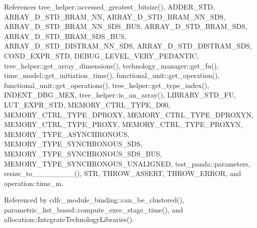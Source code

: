 References tree\+\_\+helper\+::accessed\+\_\+greatest\+\_\+bitsize(), A\+D\+D\+E\+R\+\_\+\+S\+TD, A\+R\+R\+A\+Y\+\_\+D\+\_\+\+S\+T\+D\+\_\+\+B\+R\+A\+M\+\_\+\+NN, A\+R\+R\+A\+Y\+\_\+D\+\_\+\+S\+T\+D\+\_\+\+B\+R\+A\+M\+\_\+\+N\+N\+\_\+\+S\+DS, A\+R\+R\+A\+Y\+\_\+D\+\_\+\+S\+T\+D\+\_\+\+B\+R\+A\+M\+\_\+\+N\+N\+\_\+\+S\+D\+S\+\_\+\+B\+US, A\+R\+R\+A\+Y\+\_\+D\+\_\+\+S\+T\+D\+\_\+\+B\+R\+A\+M\+\_\+\+S\+DS, A\+R\+R\+A\+Y\+\_\+D\+\_\+\+S\+T\+D\+\_\+\+B\+R\+A\+M\+\_\+\+S\+D\+S\+\_\+\+B\+US, A\+R\+R\+A\+Y\+\_\+D\+\_\+\+S\+T\+D\+\_\+\+D\+I\+S\+T\+R\+A\+M\+\_\+\+N\+N\+\_\+\+S\+DS, A\+R\+R\+A\+Y\+\_\+D\+\_\+\+S\+T\+D\+\_\+\+D\+I\+S\+T\+R\+A\+M\+\_\+\+S\+DS, C\+O\+N\+D\+\_\+\+E\+X\+P\+R\+\_\+\+S\+TD, D\+E\+B\+U\+G\+\_\+\+L\+E\+V\+E\+L\+\_\+\+V\+E\+R\+Y\+\_\+\+P\+E\+D\+A\+N\+T\+IC, tree\+\_\+helper\+::get\+\_\+array\+\_\+dimensions(), technology\+\_\+manager\+::get\+\_\+fu(), time\+\_\+model\+::get\+\_\+initiation\+\_\+time(), functional\+\_\+unit\+::get\+\_\+operation(), functional\+\_\+unit\+::get\+\_\+operations(), tree\+\_\+helper\+::get\+\_\+type\+\_\+index(), I\+N\+D\+E\+N\+T\+\_\+\+D\+B\+G\+\_\+\+M\+EX, tree\+\_\+helper\+::is\+\_\+an\+\_\+array(), L\+I\+B\+R\+A\+R\+Y\+\_\+\+S\+T\+D\+\_\+\+FU, L\+U\+T\+\_\+\+E\+X\+P\+R\+\_\+\+S\+TD, M\+E\+M\+O\+R\+Y\+\_\+\+C\+T\+R\+L\+\_\+\+T\+Y\+P\+E\+\_\+\+D00, M\+E\+M\+O\+R\+Y\+\_\+\+C\+T\+R\+L\+\_\+\+T\+Y\+P\+E\+\_\+\+D\+P\+R\+O\+XY, M\+E\+M\+O\+R\+Y\+\_\+\+C\+T\+R\+L\+\_\+\+T\+Y\+P\+E\+\_\+\+D\+P\+R\+O\+X\+YN, M\+E\+M\+O\+R\+Y\+\_\+\+C\+T\+R\+L\+\_\+\+T\+Y\+P\+E\+\_\+\+P\+R\+O\+XY, M\+E\+M\+O\+R\+Y\+\_\+\+C\+T\+R\+L\+\_\+\+T\+Y\+P\+E\+\_\+\+P\+R\+O\+X\+YN, M\+E\+M\+O\+R\+Y\+\_\+\+T\+Y\+P\+E\+\_\+\+A\+S\+Y\+N\+C\+H\+R\+O\+N\+O\+US, M\+E\+M\+O\+R\+Y\+\_\+\+T\+Y\+P\+E\+\_\+\+S\+Y\+N\+C\+H\+R\+O\+N\+O\+U\+S\+\_\+\+S\+DS, M\+E\+M\+O\+R\+Y\+\_\+\+T\+Y\+P\+E\+\_\+\+S\+Y\+N\+C\+H\+R\+O\+N\+O\+U\+S\+\_\+\+S\+D\+S\+\_\+\+B\+US, M\+E\+M\+O\+R\+Y\+\_\+\+T\+Y\+P\+E\+\_\+\+S\+Y\+N\+C\+H\+R\+O\+N\+O\+U\+S\+\_\+\+U\+N\+A\+L\+I\+G\+N\+ED, test\+\_\+panda\+::parameters, resize\+\_\+to\+\_\+\_\+\_\+\_\+\_\+\_\+\_\+\_(), S\+TR, T\+H\+R\+O\+W\+\_\+\+A\+S\+S\+E\+RT, T\+H\+R\+O\+W\+\_\+\+E\+R\+R\+OR, and operation\+::time\+\_\+m.



Referenced by cdfc\+\_\+module\+\_\+binding\+::can\+\_\+be\+\_\+clustered(), parametric\+\_\+list\+\_\+based\+::compute\+\_\+exec\+\_\+stage\+\_\+time(), and allocation\+::\+Integrate\+Technology\+Libraries().

